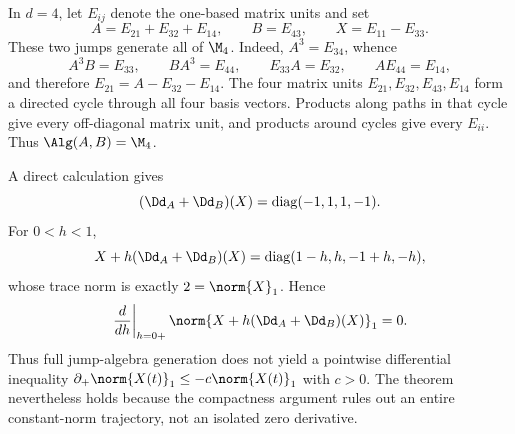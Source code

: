 \documentclass[class=article,11pt,a4paper,crop=false]{standalone}
\begin{document}
\begin{remark}
\label{rem:q2-four-dimensional-example}
In $d=4$, let $E_{ij}$ denote the one-based matrix units and set
\begin{equation}
 A=E_{21}+E_{32}+E_{14},\qquad B=E_{43},\qquad
 X=E_{11}-E_{33}.
 \label{eq:q2-example-data}
\end{equation}
These two jumps generate all of $\M_4$. Indeed,
$A^3=E_{34}$, whence
\begin{equation}
 A^3B=E_{33},\qquad BA^3=E_{44},\qquad
 E_{33}A=E_{32},\qquad AE_{44}=E_{14},
\end{equation}
and therefore $E_{21}=A-E_{32}-E_{14}$. The four matrix units
$E_{21},E_{32},E_{43},E_{14}$ form a directed cycle through all four basis
vectors. Products along paths in that cycle give every off-diagonal matrix
unit, and products around cycles give every $E_{ii}$. Thus
$\Alg(A,B)=\M_4$.

A direct calculation gives
\begin{equation}
 (\Dd_A+\Dd_B)(X)
   =\operatorname{diag}(-1,1,1,-1).
 \label{eq:q2-example-dissipator}
\end{equation}
For $0<h<1$,
\begin{equation}
 X+h(\Dd_A+\Dd_B)(X)
  =\operatorname{diag}(1-h,h,-1+h,-h),
\end{equation}
whose trace norm is exactly $2=\norm{X}_1$. Hence
\begin{equation}
 \left.\frac{d}{dh}\right|_{h=0+}
 \norm{X+h(\Dd_A+\Dd_B)(X)}_1=0.
\end{equation}
Thus full jump-algebra generation does not yield a pointwise differential
inequality $\partial_+\norm{X(t)}_1\le-c\norm{X(t)}_1$ with $c>0$. The theorem
nevertheless holds because the compactness argument rules out an entire
constant-norm trajectory, not an isolated zero derivative.
\end{remark}
\end{document}
